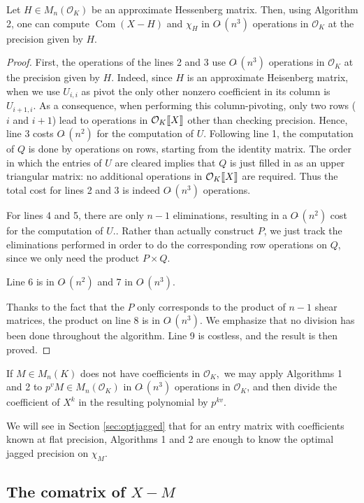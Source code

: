 \documentclass{sig-alternate-05-2015}
\DeclareMathOperator{\com}{Com}
\newcommand{\OK}{\mathcal{O}_K}
\newcommand{\llb}{[\mkern-2.5mu[}
\newcommand{\rrb}{]\mkern-2.5mu]}
\newcommand{\softO}{O\tilde{~}}
\begin{document}
\begin{theo}
Let $H \in M_n(\OK)$ be an approximate Hessenberg matrix.
Then, using Algorithm 2, one can compute $\com (X -H)$
and $\chi_H$ in 
$\softO (n^3)$ operations in $\OK$ at the precision given by $H.$
\end{theo}
\begin{proof}
First, the operations of the lines 2 and 3 use $\softO (n^3)$ operations
in $\OK$ at the precision given by $H.$
Indeed, since $H$ is an approximate Heisenberg matrix, when we use $U_{i,i}$ as pivot
the only other nonzero coefficient in its column is $U_{i+1,i}$.
As a consequence, when performing this column-pivoting, only two rows ($i$ and
$i+1$) lead to operations in $\OK \llb X \rrb$ other than checking precision.
Hence, line 3 costs $\softO (n^2)$ for the computation of $U.$
Following line 1, the computation of $Q$ is done by operations on rows, starting from the identity matrix.
The order in which the entries of $U$ are cleared implies that $Q$ is just filled in as an upper triangular matrix:
no additional operations in $\OK\llb X\rrb$ are required. Thus the total cost
for lines 2 and 3 is indeed $\softO (n^3)$ operations.

For lines 4 and 5, there are only $n-1$ eliminations, resulting in a $\softO (n^2)$ cost
for the computation of $U.$. Rather than actually construct $P$, we just track the eliminations
performed in order to do the corresponding row operations on $Q$, since we only need the product $P \times Q$.

Line 6 is in $\softO (n^2)$ and 7 in $\softO (n^3).$

Thanks to the fact that the $P$ only corresponds to the product of $n-1$ 
shear matrices, the
product on line 8 is in $\softO (n^3).$
We emphasize that no division has been done throughout the algorithm.
Line 9 is costless, and the result is then proved.
\end{proof}
\begin{rem}
If $M \in M_n(K)$ does not have coefficients in $\OK,$
we may apply Algorithms 1 and 2 to $p^v M \in M_n(\OK)$
in $\softO (n^3)$ operations in $\OK$, and then divide
the coefficient of $X^k$ in the resulting polynomial by $p^{kv}$.
\end{rem}

We will see in Section \ref{sec:optjagged} that for an
entry matrix with coefficients known at flat precision,
Algorithms 1 and 2 are enough to
know the optimal jagged precision on $\chi_M.$

\subsection{The comatrix of $X{-}M$}
\end{document}
